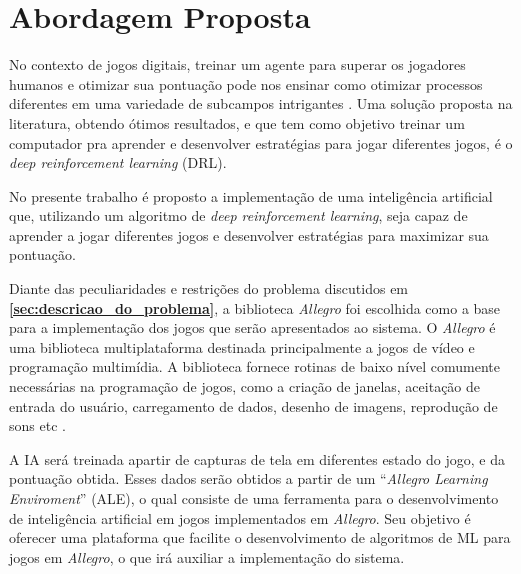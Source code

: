 \chapter{Abordagem Proposta}
\label{chap:abordagem}


No contexto de jogos digitais, treinar um agente para superar os jogadores humanos e otimizar sua pontuação pode nos ensinar como otimizar processos diferentes em uma variedade de subcampos intrigantes \cite{comi:teach:AI:DRL:2018}. Uma solução proposta na literatura, obtendo ótimos resultados, e que tem como objetivo treinar um computador pra aprender e desenvolver estratégias para jogar diferentes jogos, é o \textit{deep reinforcement learning} (DRL). 

No presente trabalho é proposto a implementação de uma inteligência artificial que, utilizando um algoritmo de \textit{deep reinforcement learning}, seja capaz de aprender a jogar diferentes jogos e desenvolver estratégias para maximizar sua pontuação. 

Diante das peculiaridades e restrições do problema discutidos em \textbf{\ref{sec:descricao_do_problema}}, a biblioteca \textit{Allegro} foi escolhida como a base para a implementação dos jogos que serão apresentados ao sistema.
O \textit{Allegro} é uma biblioteca multiplataforma destinada principalmente a jogos de vídeo e programação multimídia. A biblioteca fornece rotinas de baixo nível comumente necessárias na programação de jogos, como a criação de janelas, aceitação de entrada do usuário, carregamento de dados, desenho de imagens, reprodução de sons etc \cite{allegro}.

A IA será treinada apartir de capturas de tela em diferentes estado do jogo, e da pontuação obtida. Esses dados serão obtidos a partir de um ``\textit{Allegro Learning Enviroment}'' (ALE), o qual consiste de uma ferramenta para o desenvolvimento de inteligência artificial em jogos implementados em \textit{Allegro}. Seu objetivo é oferecer uma plataforma que facilite o desenvolvimento de algoritmos de ML para jogos em \textit{Allegro}, o que irá auxiliar a implementação do sistema.

